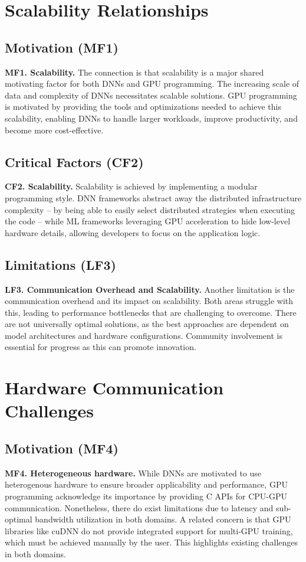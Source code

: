 \section*{Scalability Relationships}
\subsection*{Motivation (MF1)}
\textbf{MF1. Scalability.} The connection is that scalability is a major shared motivating factor for both DNNs and GPU programming.
The increasing scale of data and complexity of DNNs necessitates scalable solutions. GPU programming is
motivated by providing the tools and optimizations needed to achieve this scalability, enabling DNNs to
handle larger workloads, improve productivity, and become more cost-effective.

\subsection*{Critical Factors (CF2)}
\textbf{CF2. Scalability.} Scalability is achieved by implementing a modular programming style. DNN frameworks
abstract away the distributed infrastructure complexity -- by being able to easily select distributed
strategies when executing the code -- while ML frameworks leveraging GPU acceleration to hide
low-level hardware details, allowing developers to focus on the application logic.

\subsection*{Limitations (LF3)}
\textbf{LF3. Communication Overhead and Scalability.} Another limitation is the communication overhead and its impact on scalability. Both areas struggle
with this, leading to performance bottlenecks that are challenging to overcome. There are not universally
optimal solutions, as the best approaches are dependent on model architectures and hardware configurations.
Community involvement is essential for progress as this can promote innovation.

\section{Hardware Communication Challenges}
\subsection*{Motivation (MF4)}
\textbf{MF4. Heterogeneous hardware.} While DNNs are motivated to use heterogenous hardware to ensure broader applicability and performance, GPU programming
acknowledge its importance by providing C APIs for CPU-GPU communication. Nonetheless, there do exist limitations
due to latency and sub-optimal bandwidth utilization in both domains. A related concern is that GPU libraries like cuDNN do not provide
integrated support for multi-GPU training, which must be achieved manually by the user. This highlights existing challenges
in both domains.


